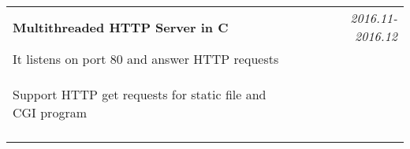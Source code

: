 \documentclass[a4paper,10pt]{article}
\begin{document}
\begin{tabular}{p{13.5cm}p{0.5cm}r}
\textbf{Multithreaded HTTP Server in C} && \emph{2016.11-2016.12} \\
\hspace{1em} It listens on port 80 and answer HTTP requests && \vspace{-0.5em} \\
\begin{compactitem}
  \item Support HTTP get requests for static file and CGI program\vspace{0.2em}
\end{compactitem}&&\vspace{-2.2em} \\
\multicolumn{3}{c}{} \\

\end{tabular}

\end{document}
